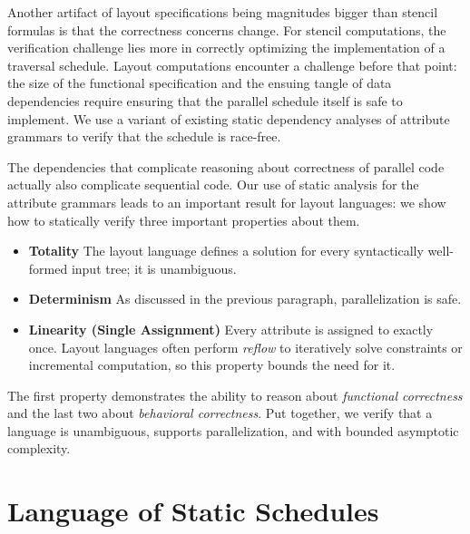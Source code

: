 Another artifact of layout specifications being magnitudes bigger than stencil formulas is that the correctness concerns change. For stencil computations, the verification challenge lies more in correctly optimizing the implementation of a traversal schedule. Layout computations encounter a challenge before that point: the size of the functional specification and the ensuing tangle of data dependencies require ensuring  that the parallel schedule itself is safe to implement. We use a variant of existing static dependency analyses of attribute grammars to verify that the schedule is race-free. 


The dependencies that complicate reasoning about correctness of parallel code actually also complicate sequential code. Our use of static analysis for the attribute grammars leads to an important result for layout languages: we show how to statically verify three important properties about them.  
\begin{itemize}
\item \textbf{Totality} The layout language defines a solution for every syntactically well-formed input tree; it is unambiguous. 
\item \textbf{Determinism} As discussed  in the previous paragraph, parallelization is safe.
\item \textbf{Linearity (Single Assignment)} Every attribute is assigned to exactly once. Layout languages often perform \emph{reflow} to iteratively solve constraints or incremental computation, so this property bounds the need for it. 
\end{itemize}
The first property demonstrates the ability to reason about \emph{functional correctness} and the last two about \emph{behavioral correctness}. Put together, we verify that a language is unambiguous, supports parallelization, and with bounded asymptotic complexity.  

\section{Language of Static Schedules}

